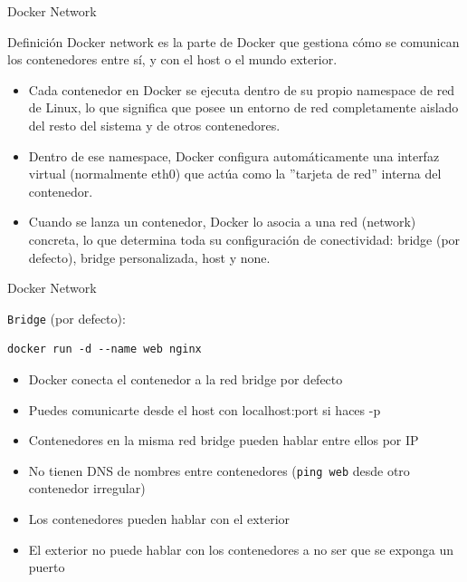 \documentclass{beamer}
\begin{document}
\begin{frame}{Docker Network}

\begin{block}{Definición}
Docker network es la parte de Docker que gestiona cómo se comunican los contenedores entre sí, y con el host o el mundo exterior.
\end{block}

\begin{itemize}
    \item Cada contenedor en Docker se ejecuta dentro de su propio namespace de red de Linux, lo que significa que posee un entorno de red completamente aislado del resto del sistema y de otros contenedores.
    \item Dentro de ese namespace, Docker configura automáticamente una interfaz virtual (normalmente eth0) que actúa como la ''tarjeta de red'' interna del contenedor.
    \item Cuando se lanza un contenedor, Docker lo asocia a una red (network) concreta, lo que determina toda su configuración de conectividad: bridge (por defecto), bridge personalizada, host y none.
\end{itemize}

    
\end{frame}

\begin{frame}[fragile]{Docker Network}

\texttt{Bridge} (por defecto):

\begin{verbatim}
docker run -d --name web nginx
\end{verbatim}

\begin{itemize}
    \item Docker conecta el contenedor a la red bridge por defecto
    \item Puedes comunicarte desde el host con localhost:port si haces -p
    \item Contenedores en la misma red bridge pueden hablar entre ellos por IP
    \item No tienen DNS de nombres entre contenedores (\texttt{ping web} desde otro contenedor irregular)
    \item Los contenedores pueden hablar con el exterior
    \item El exterior no puede hablar con los contenedores a no ser que se exponga un puerto
\end{itemize}
    
\end{frame}
\end{document}
